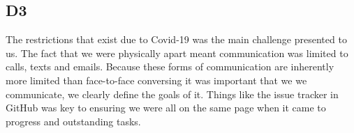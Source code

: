 \subsection{D3}
    The restrictions that exist due to Covid-19 was the main challenge presented to us. The fact that we were physically apart meant communication was limited to calls, texts and emails. Because these forms of communication are inherently more limited than face-to-face conversing it was important that we we communicate, we clearly define the goals of it. Things like the issue tracker in GitHub was key to ensuring we were all on the same page when it came to progress and outstanding tasks. 
